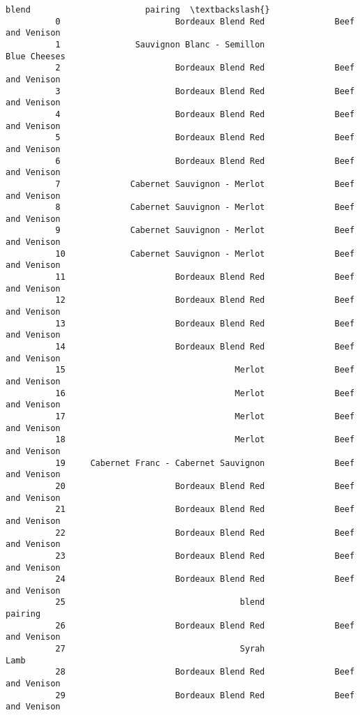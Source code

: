 \documentclass[11pt]{article}
\begin{document}
\begin{Verbatim}[commandchars=\\\{\}]
                                               blend                       pairing  \textbackslash{}
          0                       Bordeaux Blend Red              Beef and Venison   
          1               Sauvignon Blanc - Semillon                  Blue Cheeses   
          2                       Bordeaux Blend Red              Beef and Venison   
          3                       Bordeaux Blend Red              Beef and Venison   
          4                       Bordeaux Blend Red              Beef and Venison   
          5                       Bordeaux Blend Red              Beef and Venison   
          6                       Bordeaux Blend Red              Beef and Venison   
          7              Cabernet Sauvignon - Merlot              Beef and Venison   
          8              Cabernet Sauvignon - Merlot              Beef and Venison   
          9              Cabernet Sauvignon - Merlot              Beef and Venison   
          10             Cabernet Sauvignon - Merlot              Beef and Venison   
          11                      Bordeaux Blend Red              Beef and Venison   
          12                      Bordeaux Blend Red              Beef and Venison   
          13                      Bordeaux Blend Red              Beef and Venison   
          14                      Bordeaux Blend Red              Beef and Venison   
          15                                  Merlot              Beef and Venison   
          16                                  Merlot              Beef and Venison   
          17                                  Merlot              Beef and Venison   
          18                                  Merlot              Beef and Venison   
          19     Cabernet Franc - Cabernet Sauvignon              Beef and Venison   
          20                      Bordeaux Blend Red              Beef and Venison   
          21                      Bordeaux Blend Red              Beef and Venison   
          22                      Bordeaux Blend Red              Beef and Venison   
          23                      Bordeaux Blend Red              Beef and Venison   
          24                      Bordeaux Blend Red              Beef and Venison   
          25                                   blend                       pairing   
          26                      Bordeaux Blend Red              Beef and Venison   
          27                                   Syrah                          Lamb   
          28                      Bordeaux Blend Red              Beef and Venison   
          29                      Bordeaux Blend Red              Beef and Venison   

\end{Verbatim}
\end{document}
